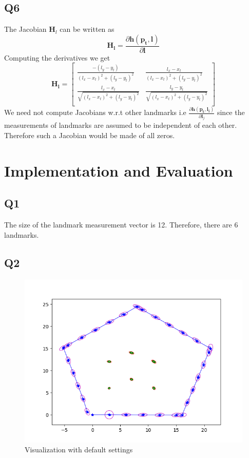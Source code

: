 \documentclass[12pt, a4paper]{article}
\begin{document}
\subsection{Q6}
The Jacobian $\mathbf{H}_l$ can be written as
\[\mathbf{H_l} = \frac{\partial \mathbf{h(\mathbf{p}_t, \mathbf{l})}}{\partial\mathbf{l}}\]
Computing the derivatives we get
\[\mathbf{H_l} = \begin{bmatrix}
  \frac{-(l_y - y_t)}{(l_x - x_t)^2 + (l_y - y_t)^2} & \frac{l_x - x_t}{(l_x - x_t)^2 + (l_y - y_t)^2}\\
  \frac{l_x - x_t}{\sqrt{(l_x - x_t)^2 + (l_y - y_t)^2}} & \frac{l_y - y_t}{\sqrt{(l_x - x_t)^2 + (l_y - y_t)^2}}\\
\end{bmatrix}\]
We need not compute Jacobians w.r.t other landmarks i.e $\frac{\partial \mathbf{h(\mathbf{p}_t, \mathbf{l}_i)}}{\partial\mathbf{l}_j}$ since the measurements of landmarks are assumed to be independent of each other. Therefore such a Jacobian would be made of all zeros.


\section{Implementation and Evaluation}
\subsection{Q1}
The size of the landmark measurement vector is 12. Therefore, there are 6 landmarks.
\subsection{Q2}
\begin{figure}[H]
  \centering
  \includegraphics[width=1\textwidth]{./results/q2_2/result.png}
  \caption{Visualization with default settings}
\end{figure}
\end{document}

